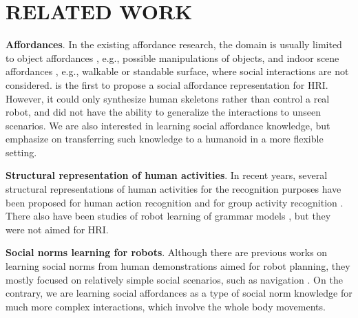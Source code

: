 \documentclass[letterpaper, 10 pt, conference]{ieeeconf}  %
\begin{document}

\section{RELATED WORK}


\textbf{Affordances}. In the existing affordance research, the domain is usually limited to object affordances \cite{Montesano2008,Kjellstrom2011,Bogdan2012,Zhu2014,Koppula2014,Pieropan2014,Sheng2015,Zhu2015}, e.g., possible manipulations of objects, and indoor scene affordances \cite{Gupta2011,Jiang2013}, e.g., walkable or standable surface, where social interactions are not considered. \cite{Shuijcai2016} is the first to propose a social affordance representation for HRI. However, it could only synthesize human skeletons rather than control a real robot, and did not have the ability to generalize the interactions to unseen scenarios. We are also interested in learning social affordance knowledge, but emphasize on transferring such knowledge to a humanoid in a more flexible setting.

\textbf{Structural representation of human activities}. In recent years, several structural representations of human activities for the recognition purposes have been proposed for human action recognition \cite{Gupta2009,Brendel2011,Pei2013,Lan2015} and for group activity recognition \cite{RyooIJCV2011,LanPAMI2012,Amer2012,Choi2014,Lan2014,Shu2015,Deng2016}. There also have been studies of robot learning of grammar models \cite{Lee2013, Yang2015, Xiong2016}, but they were not aimed for HRI.

\textbf{Social norms learning for robots}. Although there are previous works on learning social norms from human demonstrations aimed for robot planning, they mostly focused on relatively simple social scenarios, such as navigation \cite{Luber2012, okal2016}. On the contrary, we are learning social affordances as a type of social norm knowledge for much more complex interactions, which involve the whole body movements.



\end{document}
